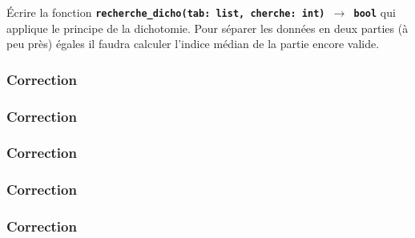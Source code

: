 \documentclass[svgnames,11pt]{beamer}
\begin{document}
\begin{frame}
    \frametitle{}

    
    \begin{activite}
        Écrire la fonction \textbf{\texttt{recherche\_dicho(tab: list, cherche: int) $\rightarrow$ bool}} qui applique le principe de la dichotomie. Pour séparer les données en deux parties (à peu près) égales il faudra calculer l'indice médian de la partie encore valide.
        \end{activite}
\end{frame}
\begin{frame}
    \frametitle{Correction}

    

\end{frame}
\begin{frame}
    \frametitle{Correction}

    

\end{frame}
\begin{frame}
    \frametitle{Correction}

    

\end{frame}
\begin{frame}
    \frametitle{Correction}

    

\end{frame}
\begin{frame}
    \frametitle{Correction}

    

\end{frame}
\end{document}

